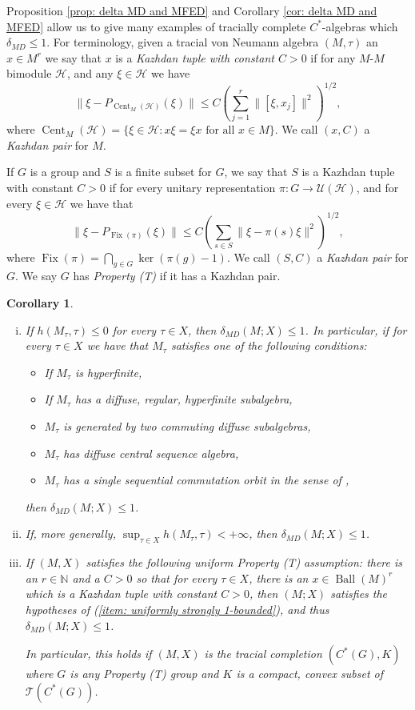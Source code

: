 \documentclass[10pt]{amsart}
\newtheorem{cor}[thm]{Corollary}
\theoremstyle{definition}
\numberwithin{equation}{section}
\newcommand{\bN}{{\mathbb N}}
\newcommand{\cH}{{\mathcal H}}
\newcommand{\cT}{{\mathcal T}}
\newcommand{\cU}{{\mathcal U}}
\DeclareMathOperator{\Ball}{Ball}
\DeclareMathOperator{\Fix}{Fix}
\DeclareMathOperator{\Cent}{Cent}
\begin{document}
Proposition \ref{prop: delta MD and MFED} and Corollary \ref{cor: delta MD and MFED} allow us to give many examples of tracially complete $C^{*}$-algebras which $\delta_{MD}\leq 1$.
For terminology, given a tracial von Neumann algebra $(M,\tau)$ an $x\in M^{r}$ we say that $x$ is a \emph{Kazhdan tuple with constant $C>0$} if for any $M$-$M$ bimodule $\cH$, and any $\xi\in \cH$ we have 
\[\|\xi-P_{\Cent_{M}(\cH)}(\xi)\|\leq C\left(\sum_{j=1}^{r}\|[\xi,x_{j}]\|^{2}\right)^{1/2},\]
where $\Cent_{M}(\cH)=\{\xi\in \cH:x\xi=\xi x \text{ for all $x\in M$}\}$. We call $(x,C)$ a \emph{Kazhdan pair} for $M$.

If $G$ is a group and $S$ is a finite subset for $G$, we say that $S$ is a Kazhdan tuple with constant $C>0$ if for every unitary representation $\pi\colon G\to \cU(\cH)$, and for every $\xi\in \cH$ we have that 
\[\|\xi-P_{\Fix(\pi)}(\xi)\|\leq C\left(\sum_{s\in S}\|\xi-\pi(s)\xi\|^{2}\right)^{1/2},\]
where $\Fix(\pi)=\bigcap_{g\in G}\ker(\pi(g)-1).$ We call $(S,C)$ a \emph{Kazhdan pair} for $G$. We say $G$ has \emph{Property (T)} if it has a Kazhdan pair. 

\begin{cor}\label{cor: basic examples of vanishing}


\begin{enumerate}[(i)]
\item \label{item: 1 bdd entropy 0} If $h(M_{\tau},\tau)\leq 0$ for every $\tau\in X$, then $\delta_{MD}(M;X)\leq 1$. In particular, if for every $\tau\in X$ we have that $M_{\tau}$ satisfies one of the following conditions:
\begin{itemize}
    \item If $M_{\tau}$ is hyperfinite,
    \item If $M_{\tau}$ has a diffuse, regular, hyperfinite subalgebra,
    \item $M_{\tau}$ is generated by two commuting diffuse subalgebras,
    \item $M_{\tau}$ has diffuse central sequence algebra,
    \item $M_{\tau}$ has a single sequential commutation orbit in the sense of  \cite{SeqCommutation},
\end{itemize}
then $\delta_{MD}(M;X)\leq 1$. 
\item \label{item: uniformly strongly 1-bounded} If, more generally, $\sup_{\tau\in X}h(M_{\tau},\tau)<+\infty$, then $\delta_{MD}(M;X)\leq 1$.  
\item \label{item: M property (T)} 
If $(M,X)$ satisfies the following uniform Property (T) assumption: there is an $r\in \bN$ and a $C>0$ so that for every $\tau\in X$, there is an $x\in \Ball(M)^{r}$ which is a Kazhdan tuple with constant $C>0$,  then $(M;X)$ satisfies the hypotheses of (\ref{item: uniformly strongly 1-bounded}), and thus $\delta_{MD}(M;X)\leq 1$. 

In particular, this holds if $(M,X)$ is the tracial completion $(C^{*}(G),K)$ where $G$ is any Property (T) group and $K$ is a compact, convex subset of $\cT(C^{*}(G))$.



\end{enumerate}


\end{cor}
\end{document}
